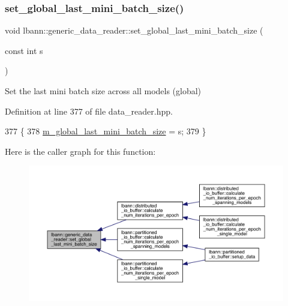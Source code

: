 \subsubsection{\texorpdfstring{set\+\_\+global\+\_\+last\+\_\+mini\+\_\+batch\+\_\+size()}{set\_global\_last\_mini\_batch\_size()}}
{\footnotesize\ttfamily void lbann\+::generic\+\_\+data\+\_\+reader\+::set\+\_\+global\+\_\+last\+\_\+mini\+\_\+batch\+\_\+size (\begin{DoxyParamCaption}\item[{const int}]{s }\end{DoxyParamCaption})\hspace{0.3cm}{\ttfamily [inline]}}



Set the last mini batch size across all models (global) 



Definition at line 377 of file data\+\_\+reader.\+hpp.


\begin{DoxyCode}
377                                                     \{
378     \hyperlink{classlbann_1_1generic__data__reader_a1d6f2d378a3f152e20b3def16f52c003}{m\_global\_last\_mini\_batch\_size} = s;
379   \}
\end{DoxyCode}
Here is the caller graph for this function\+:\nopagebreak
\begin{figure}[H]
\begin{center}
\leavevmode
\includegraphics[width=350pt]{classlbann_1_1generic__data__reader_a4455d137b469287bf964436f9fcc6d94_icgraph}
\end{center}
\end{figure}
\mbox{\label{classlbann_1_1generic__data__reader_a03388338e75d37e1b28389d22bd5b604}} 
